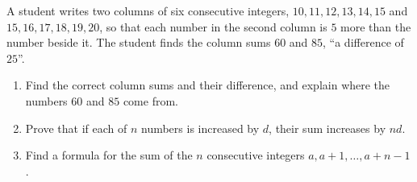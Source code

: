 A student writes two columns of six consecutive integers, $10,11,12,13,14,15$ and $15,16,17,18,19,20$, so that each number in the second column is $5$ more than the number beside it. The student finds the column sums $60$ and $85$, ``a difference of $25$''.
\begin{enumerate}
\item[(a)] Find the correct column sums and their difference, and explain where the numbers $60$ and $85$ come from.
\item[(b)] Prove that if each of $n$ numbers is increased by $d$, their sum increases by $nd$.
\item[(c)] Find a formula for the sum of the $n$ consecutive integers $a,a+1,\dots,a+n-1$.
\end{enumerate}
